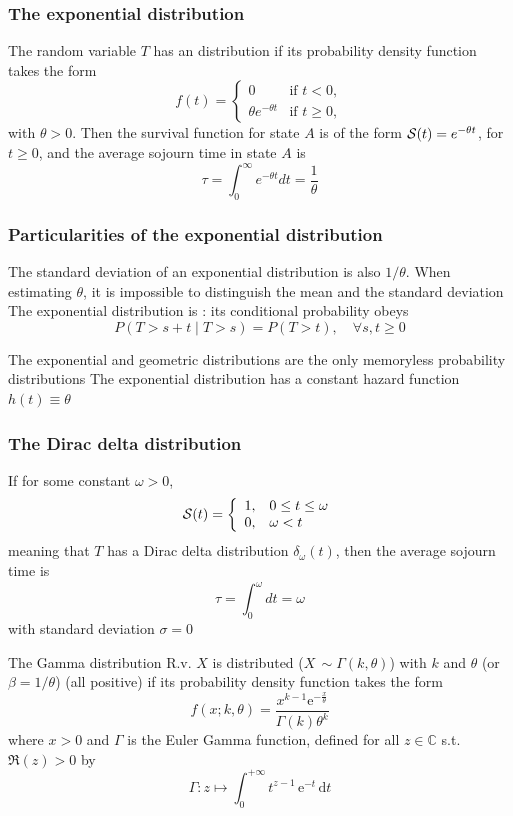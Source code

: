 \documentclass[aspectratio=169]{beamer}
\begin{document}
\begin{frame}\frametitle{The exponential distribution}
The random variable $T$ has an  distribution if its
probability density function takes the form
\begin{equation}\label{eq:exp_distrib}
f(t)=\begin{cases}0&\textrm{if }t<0,\\
\theta e^{-\theta t}&\textrm{if }t\geq 0,
\end{cases}
\end{equation}
with $\theta>0$. Then the
survival function for state $A$ is of the form $\S(t)=e^{-\theta
  t}$, for $t\geq 0$, and the average sojourn time in state $A$ is
\[
\tau=\int_0^\infty e^{-\theta t}dt=\frac 1\theta
\]
\end{frame}

\begin{frame}\frametitle{Particularities of the exponential distribution}
The standard deviation of an exponential distribution is also $1/\theta$. When estimating $\theta$, it is impossible to distinguish the mean and the standard deviation
\vfill
The exponential distribution is : its conditional probability obeys
\[
P(T > s + t\; |\; T > s) = P(T > t),\quad\forall s, t \ge 0
\]

The exponential and geometric distributions are the only memoryless probability distributions
\vfill
The exponential distribution has a constant hazard function $h(t)\equiv\theta$
\end{frame}




\begin{frame}\frametitle{The Dirac delta distribution}
If for some constant $\omega>0$,
\[
\S(t)=
\left\{
\begin{array}{ll}
1, & 0\leq t\leq\omega \\
0, & \omega<t
\end{array}
\right.
\]
meaning that $T$ has a Dirac delta distribution
$\delta_\omega(t)$, then the average sojourn time is
\[
\tau=\int_0^\omega dt=\omega
\]
with standard deviation $\sigma=0$
\end{frame}

\begin{frame}{The Gamma distribution}
R.v. $X$ is  distributed ($X\,\sim\Gamma(k, \theta)$) with  $k$ and  $\theta$ (or  $\beta = 1/\theta$) (all positive) if its probability density function takes the form
\begin{equation}\label{eq:gamma_distrib}
f(x;k,\theta) = \frac{x^{k-1} \mathrm{e}^{-\frac{x}{\theta}}}{\Gamma ( k)\theta ^k}
\end{equation}
where $x>0$ and $\Gamma$ is the Euler Gamma function, defined for all $z\in\mathbb{C}$ s.t. $\Re(z) > 0$ by
\[
\Gamma : z \mapsto \int_0^{+\infty}  t^{z-1}\,\mathrm{e}^{-t}\,\mathrm{d}t
\]
\end{frame}
\end{document}
